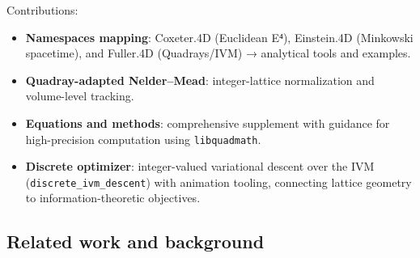 \documentclass[
]{article}
\providecommand{\tightlist}{%
  \setlength{\itemsep}{0pt}\setlength{\parskip}{0pt}}
\begin{document}
Contributions:

\begin{itemize}
\tightlist
\item
  \textbf{Namespaces mapping}: Coxeter.4D (Euclidean E⁴), Einstein.4D
  (Minkowski spacetime), and Fuller.4D (Quadrays/IVM) → analytical tools
  and examples.
\item
  \textbf{Quadray-adapted Nelder--Mead}: integer-lattice normalization
  and volume-level tracking.
\item
  \textbf{Equations and methods}: comprehensive supplement with guidance
  for high-precision computation using \texttt{libquadmath}.
\item
  \textbf{Discrete optimizer}: integer-valued variational descent over
  the IVM (\texttt{discrete\_ivm\_descent}) with animation tooling,
  connecting lattice geometry to information-theoretic objectives.
\end{itemize}

\hypertarget{related-work-and-background}{%
\subsection{Related work and
background}\label{related-work-and-background}}
\end{document}
